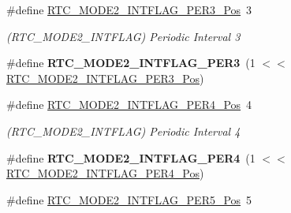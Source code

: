 \begin{DoxyCompactItemize}
\item 
\hypertarget{group___s_a_m_l21___r_t_c_ga496c04f28500ea67ea2a56f747db2722}{}\#define \hyperlink{group___s_a_m_l21___r_t_c_ga496c04f28500ea67ea2a56f747db2722}{R\+T\+C\+\_\+\+M\+O\+D\+E2\+\_\+\+I\+N\+T\+F\+L\+A\+G\+\_\+\+P\+E\+R3\+\_\+\+Pos}~3\label{group___s_a_m_l21___r_t_c_ga496c04f28500ea67ea2a56f747db2722}

\begin{DoxyCompactList}\small\item\em (R\+T\+C\+\_\+\+M\+O\+D\+E2\+\_\+\+I\+N\+T\+F\+L\+A\+G) Periodic Interval 3 \end{DoxyCompactList}\item 
\hypertarget{group___s_a_m_l21___r_t_c_ga18fc3f3d661ca702b596aa87e4b92404}{}\#define {\bfseries R\+T\+C\+\_\+\+M\+O\+D\+E2\+\_\+\+I\+N\+T\+F\+L\+A\+G\+\_\+\+P\+E\+R3}~(1 $<$$<$ \hyperlink{group___s_a_m_l21___r_t_c_ga496c04f28500ea67ea2a56f747db2722}{R\+T\+C\+\_\+\+M\+O\+D\+E2\+\_\+\+I\+N\+T\+F\+L\+A\+G\+\_\+\+P\+E\+R3\+\_\+\+Pos})\label{group___s_a_m_l21___r_t_c_ga18fc3f3d661ca702b596aa87e4b92404}

\item 
\hypertarget{group___s_a_m_l21___r_t_c_gac7cef2ce798197a90b9c0e797ad2fc6d}{}\#define \hyperlink{group___s_a_m_l21___r_t_c_gac7cef2ce798197a90b9c0e797ad2fc6d}{R\+T\+C\+\_\+\+M\+O\+D\+E2\+\_\+\+I\+N\+T\+F\+L\+A\+G\+\_\+\+P\+E\+R4\+\_\+\+Pos}~4\label{group___s_a_m_l21___r_t_c_gac7cef2ce798197a90b9c0e797ad2fc6d}

\begin{DoxyCompactList}\small\item\em (R\+T\+C\+\_\+\+M\+O\+D\+E2\+\_\+\+I\+N\+T\+F\+L\+A\+G) Periodic Interval 4 \end{DoxyCompactList}\item 
\hypertarget{group___s_a_m_l21___r_t_c_gaddec6f47979f1ca99935a296f5d705af}{}\#define {\bfseries R\+T\+C\+\_\+\+M\+O\+D\+E2\+\_\+\+I\+N\+T\+F\+L\+A\+G\+\_\+\+P\+E\+R4}~(1 $<$$<$ \hyperlink{group___s_a_m_l21___r_t_c_gac7cef2ce798197a90b9c0e797ad2fc6d}{R\+T\+C\+\_\+\+M\+O\+D\+E2\+\_\+\+I\+N\+T\+F\+L\+A\+G\+\_\+\+P\+E\+R4\+\_\+\+Pos})\label{group___s_a_m_l21___r_t_c_gaddec6f47979f1ca99935a296f5d705af}

\item 
\hypertarget{group___s_a_m_l21___r_t_c_ga7fd069649370679c5ed1e874deee5893}{}\#define \hyperlink{group___s_a_m_l21___r_t_c_ga7fd069649370679c5ed1e874deee5893}{R\+T\+C\+\_\+\+M\+O\+D\+E2\+\_\+\+I\+N\+T\+F\+L\+A\+G\+\_\+\+P\+E\+R5\+\_\+\+Pos}~5\label{group___s_a_m_l21___r_t_c_ga7fd069649370679c5ed1e874deee5893}


\end{DoxyCompactItemize}

